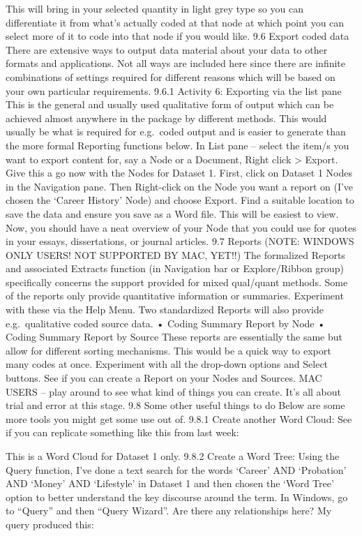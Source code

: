\documentclass[
]{book}
\begin{document}
This will bring in your selected quantity in light grey type so you can differentiate it from what's actually coded at that node at which point you can select more of it to code into that node if you would like.
9.6 Export coded data
There are extensive ways to output data material about your data to other formats and applications. Not all ways are included here since there are infinite combinations of settings required for different reasons which will be based on your own particular requirements.
9.6.1 Activity 6: Exporting via the list pane
This is the general and usually used qualitative form of output which can be achieved almost anywhere in the package by different methods. This would usually be what is required for e.g.~coded output and is easier to generate than the more formal Reporting functions below.
In List pane -- select the item/s you want to export content for, say a Node or a Document, Right click \textgreater{} Export. Give this a go now with the Nodes for Dataset 1. First, click on Dataset 1 Nodes in the Navigation pane. Then Right-click on the Node you want a report on (I've chosen the `Career History' Node) and choose Export. Find a suitable location to save the data and ensure you save as a Word file. This will be easiest to view. Now, you should have a neat overview of your Node that you could use for quotes in your essays, dissertations, or journal articles.
9.7 Reports (NOTE: WINDOWS ONLY USERS! NOT SUPPORTED BY MAC, YET!!)
The formalized Reports and associated Extracts function (in Navigation bar or Explore/Ribbon group) specifically concerns the support provided for mixed qual/quant methods. Some of the reports only provide quantitative information or summaries. Experiment with these via the Help Menu.
Two standardized Reports will also provide e.g.~qualitative coded source data.
• Coding Summary Report by Node
• Coding Summary Report by Source
These reports are essentially the same but allow for different sorting mechanisms. This would be a quick way to export many codes at once. Experiment with all the drop-down options and Select buttons.
See if you can create a Report on your Nodes and Sources.
MAC USERS -- play around to see what kind of things you can create. It's all about trial and error at this stage.
9.8 Some other useful things to do
Below are some more tools you might get some use out of.
9.8.1 Create another Word Cloud:
See if you can replicate something like this from last week:

This is a Word Cloud for Dataset 1 only.
9.8.2 Create a Word Tree:
Using the Query function, I've done a text search for the words `Career' AND `Probation' AND `Money' AND `Lifestyle' in Dataset 1 and then chosen the `Word Tree' option to better understand the key discourse around the term. In Windows, go to ``Query'' and then ``Query Wizard''. Are there any relationships here? My query produced this:
\end{document}
